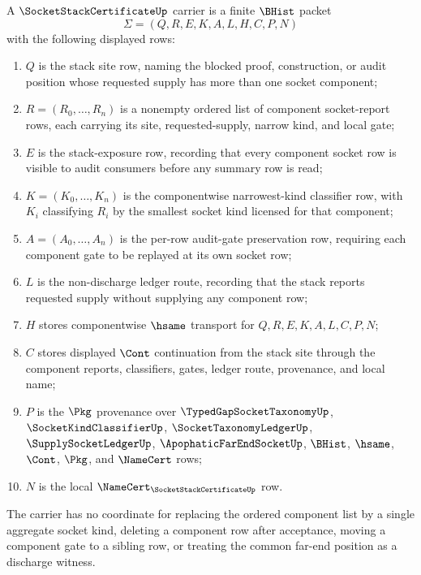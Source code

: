 \begin{definition}
\label{def:socket-stack-certificate-carrier}
A $\SocketStackCertificateUp$ carrier is a finite $\BHist$ packet
$$
\Sigma=(Q,R,E,K,A,L,H,C,P,N)
$$
with the following displayed rows:
\begin{enumerate}
\item $Q$ is the stack site row, naming the blocked proof, construction, or audit position whose requested supply has more than one socket component;
\item $R=(R_0,\ldots,R_n)$ is a nonempty ordered list of component socket-report rows, each carrying its site, requested-supply, narrow kind, and local gate;
\item $E$ is the stack-exposure row, recording that every component socket row is visible to audit consumers before any summary row is read;
\item $K=(K_0,\ldots,K_n)$ is the componentwise narrowest-kind classifier row, with $K_i$ classifying $R_i$ by the smallest socket kind licensed for that component;
\item $A=(A_0,\ldots,A_n)$ is the per-row audit-gate preservation row, requiring each component gate to be replayed at its own socket row;
\item $L$ is the non-discharge ledger route, recording that the stack reports requested supply without supplying any component row;
\item $H$ stores componentwise $\hsame$ transport for $Q,R,E,K,A,L,C,P,N$;
\item $C$ stores displayed $\Cont$ continuation from the stack site through the component reports, classifiers, gates, ledger route, provenance, and local name;
\item $P$ is the $\Pkg$ provenance over $\TypedGapSocketTaxonomyUp$, $\SocketKindClassifierUp$, $\SocketTaxonomyLedgerUp$, $\SupplySocketLedgerUp$, $\ApophaticFarEndSocketUp$, $\BHist$, $\hsame$, $\Cont$, $\Pkg$, and $\NameCert$ rows;
\item $N$ is the local $\NameCert_{\SocketStackCertificateUp}$ row.
\end{enumerate}
The carrier has no coordinate for replacing the ordered component list by a single aggregate socket kind, deleting a component row after acceptance, moving a component gate to a sibling row, or treating the common far-end position as a discharge witness.
\end{definition}

